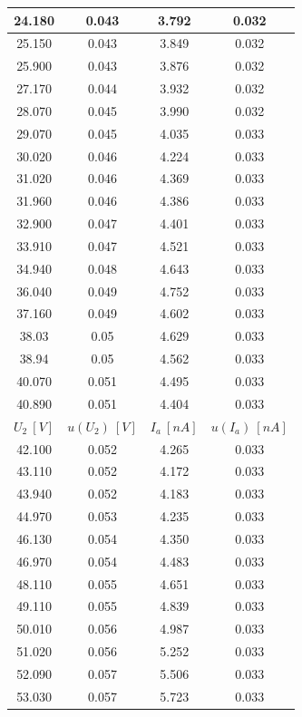 \documentclass[12pt, a4paper, oneside]{article}
\begin{document}
\begin{longtable}{|c|c|c|c|}
    24.180 & 0.043 & 3.792 & 0.032 \\\hline
    25.150 & 0.043 & 3.849 & 0.032 \\\hline
    25.900 & 0.043 & 3.876 & 0.032 \\\hline
    27.170 & 0.044 & 3.932 & 0.032 \\\hline
    28.070 & 0.045 & 3.990 & 0.032 \\\hline
    29.070 & 0.045 & 4.035 & 0.033 \\\hline
    30.020 & 0.046 & 4.224 & 0.033 \\\hline
    31.020 & 0.046 & 4.369 & 0.033 \\\hline
    31.960 & 0.046 & 4.386 & 0.033 \\\hline
    32.900 & 0.047 & 4.401 & 0.033 \\\hline
    33.910 & 0.047 & 4.521 & 0.033 \\\hline
    34.940 & 0.048 & 4.643 & 0.033 \\\hline
    36.040 & 0.049 & 4.752 & 0.033 \\\hline
    37.160 & 0.049 & 4.602 & 0.033 \\\hline
    38.03 & 0.05 & 4.629 & 0.033 \\\hline
    38.94 & 0.05 & 4.562 & 0.033 \\\hline
    40.070 & 0.051 & 4.495 & 0.033 \\\hline
    40.890 & 0.051 & 4.404 & 0.033 \\\hline
    $U_2~[V]$ & $u(U_2)~[V]$ & $I_a~[nA]$ & $u(I_a)~[nA]$ \\\hline    
    42.100 & 0.052 & 4.265 & 0.033 \\\hline
    43.110 & 0.052 & 4.172 & 0.033 \\\hline
    43.940 & 0.052 & 4.183 & 0.033 \\\hline
    44.970 & 0.053 & 4.235 & 0.033 \\\hline
    46.130 & 0.054 & 4.350 & 0.033 \\\hline
    46.970 & 0.054 & 4.483 & 0.033 \\\hline
    48.110 & 0.055 & 4.651 & 0.033 \\\hline
    49.110 & 0.055 & 4.839 & 0.033 \\\hline
    50.010 & 0.056 & 4.987 & 0.033 \\\hline
    51.020 & 0.056 & 5.252 & 0.033 \\\hline
    52.090 & 0.057 & 5.506 & 0.033 \\\hline
    53.030 & 0.057 & 5.723 & 0.033 \\\hline

\end{longtable}
\end{document}
